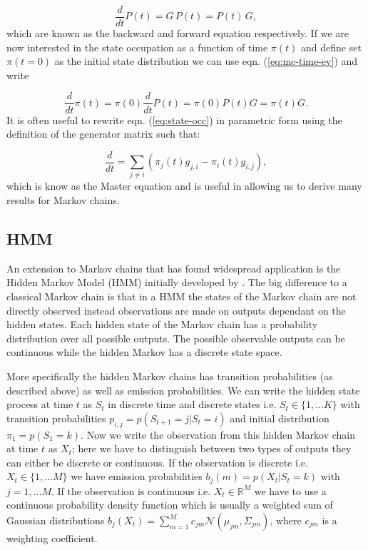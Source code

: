 \begin{equation}
  \label{eq:mc-time-ev}
  \frac{d}{dt} P(t) = G\, P(t) = P(t)\, G,
\end{equation}
which are known as the backward and forward equation respectively. If we are now interested in the state occupation as a function of time $\pi(t)$ and define set $\pi(t=0)$ as the initial state distribution we can use eqn. (\ref{eq:mc-time-ev}) and write

\begin{equation}
  \label{eq:state-occ}
  \frac{d}{dt}\pi(t) = \pi(0) \frac{d}{dt} P(t) = \pi(0) P(t) G = \pi(t)G.
\end{equation}
It is often useful to rewrite eqn. (\ref{eq:state-occ}) in parametric form using the definition of the generator matrix such that:

\begin{equation}
  \label{eq:mc-master}
  \frac{d}{dt} = \sum_{j\neq i} \left( \pi_j(t)g_{j,i} - \pi_i(t)g_{i,j} \right),
\end{equation}
which is know as the Master equation and is useful in allowing us to derive many results for Markov chains.

\subsection{HMM}
\label{sec:hmm}

An extension to Markov chains that has found widespread application is the Hidden Markov Model (HMM) initially developed by \cite{Baum:1966cy}. The big difference to a classical Markov chain is that in a HMM the states of the Markov chain are not directly observed instead observations are made on outputs dependant on the hidden states. Each hidden state of the Markov chain has a probability distribution over all possible outputs. The possible observable outputs can be continuous while the hidden Markov has a discrete state space.

More specifically the hidden Markov chains has transition probabilities (as described above) as well as emission probabilities. We can write the hidden state process at time $t$ as $S_t$ in discrete time and discrete states i.e. $S_t \in \lbrace 1, \ldots K \rbrace$ with transition probabilities $p_{i,j} = p(S_{t+1} =j | S_t =i)$ and initial distribution $\pi_1 = p(S_1 = k)$. Now we write the observation from this hidden Markov chain at time $t$ as $X_t$; here we have to distinguish between two types of outputs they can either be discrete or continuous. If the observation is discrete i.e. $X_t \in \lbrace 1, \ldots M \rbrace$ we have emission probabilities  $b_j(m) = p(X_t | S_t = k)$ with $j = 1, \ldots M$. If the observation is continuous i.e. $X_t \in \mathbb{R}^M$ we have to use a continuous probability density function which is usually a weighted sum of Gaussian distributions $b_j(X_t) = \sum_{m=1}^M c_{jm}\mathcal{N}(\mu_{jm}, \Sigma_{jm})$, where $c_{jm}$ is a weighting coefficient.


